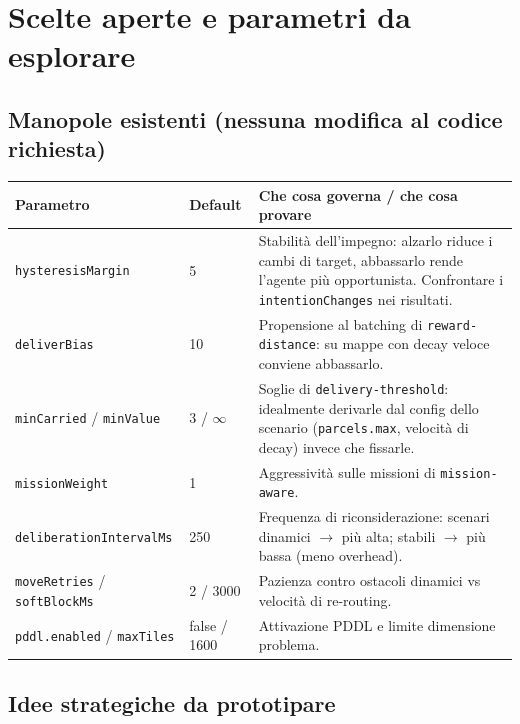 \documentclass[11pt,a4paper]{article}
\newcommand{\code}[1]{\texttt{#1}}
\begin{document}
\section{Scelte aperte e parametri da esplorare}

\subsection{Manopole esistenti (nessuna modifica al codice richiesta)}

\begin{longtable}{@{}llp{}@{}}
\toprule
\textbf{Parametro} & \textbf{Default} & \textbf{Che cosa governa / che cosa provare} \\
\midrule
\code{hysteresisMargin} & 5 & Stabilità dell'impegno: alzarlo riduce i
  cambi di target, abbassarlo rende l'agente più opportunista. Confrontare
  i \code{intentionChanges} nei risultati. \\
\code{deliverBias} & 10 & Propensione al batching di
  \code{reward-distance}: su mappe con decay veloce conviene abbassarlo. \\
\code{minCarried} / \code{minValue} & 3 / $\infty$ & Soglie di
  \code{delivery-threshold}: idealmente derivarle dal config dello
  scenario (\code{parcels.max}, velocità di decay) invece che fissarle. \\
\code{missionWeight} & 1 & Aggressività sulle missioni di
  \code{mission-aware}. \\
\code{deliberationIntervalMs} & 250 & Frequenza di riconsiderazione:
  scenari dinamici $\rightarrow$ più alta; stabili $\rightarrow$ più
  bassa (meno overhead). \\
\code{moveRetries} / \code{softBlockMs} & 2 / 3000 & Pazienza contro
  ostacoli dinamici vs velocità di re-routing. \\
\code{pddl.enabled} / \code{maxTiles} & false / 1600 & Attivazione PDDL e
  limite dimensione problema. \\
\bottomrule
\end{longtable}

\subsection{Idee strategiche da prototipare}
\end{document}
